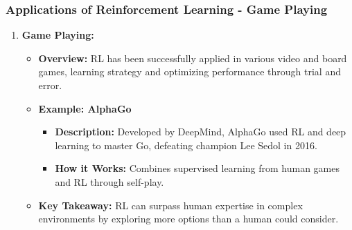 \documentclass[aspectratio=169]{beamer}
\begin{document}
\begin{frame}[fragile]
    \frametitle{Applications of Reinforcement Learning - Game Playing}
    \begin{enumerate}
        \item \textbf{Game Playing:}
        \begin{itemize}
            \item \textbf{Overview:} 
            RL has been successfully applied in various video and board games, learning strategy and optimizing performance through trial and error.
            \item \textbf{Example: AlphaGo}
            \begin{itemize}
                \item \textbf{Description:} Developed by DeepMind, AlphaGo used RL and deep learning to master Go, defeating champion Lee Sedol in 2016.
                \item \textbf{How it Works:} Combines supervised learning from human games and RL through self-play.
            \end{itemize}
            \item \textbf{Key Takeaway:} RL can surpass human expertise in complex environments by exploring more options than a human could consider.
        \end{itemize}
    \end{enumerate}
\end{frame}
\end{document}
